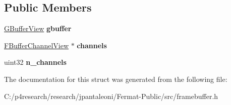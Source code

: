 \subsection*{Public Members}
\begin{DoxyCompactItemize}
\item 
\mbox{\label{struct_f_buffer_view_a75c312f9f321c4f49c043ab79a6c1886}} 
\hyperlink{struct_g_buffer_view}{G\+Buffer\+View} {\bfseries gbuffer}
\item 
\mbox{\label{struct_f_buffer_view_abb20642b4f6d50059e9fe6c0c5efa15e}} 
\hyperlink{struct_f_buffer_channel_view}{F\+Buffer\+Channel\+View} $\ast$ {\bfseries channels}
\item 
\mbox{\label{struct_f_buffer_view_a9bd59e70da047990c49350e4d7b32b1c}} 
uint32 {\bfseries n\+\_\+channels}
\end{DoxyCompactItemize}


The documentation for this struct was generated from the following file\+:\begin{DoxyCompactItemize}
\item 
C\+:/p4research/research/jpantaleoni/\+Fermat-\/\+Public/src/framebuffer.\+h\end{DoxyCompactItemize}
